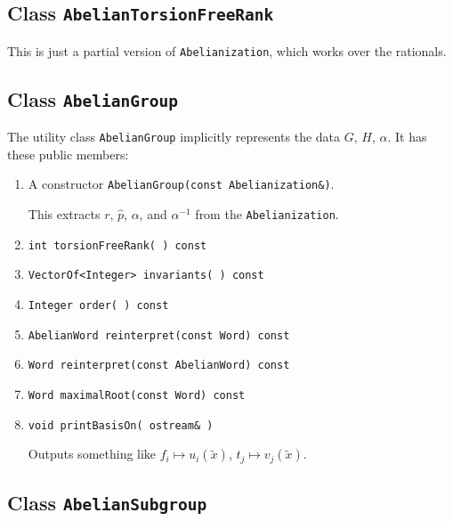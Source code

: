 \subsection{Class {\tt AbelianTorsionFreeRank}}

This is just a partial version of {\tt Abelianization}, which works
over the rationals.


\subsection{Class {\tt AbelianGroup}}

The utility class {\tt AbelianGroup} implicitly represents the data
$G$, $H$, $\alpha$.  It has these public members:

\begin{enumerate}

\item
A constructor {\tt AbelianGroup(const Abelianization\&)}.

This extracts $r$, $\hat{p}$, $\alpha$, and $\alpha^{-1}$ from the
{\tt Abelianization}.

\item
{\tt int torsionFreeRank( ) const}

\item
{\tt VectorOf<Integer> invariants( ) const}

\item
{\tt Integer order( ) const}

\item
{\tt AbelianWord reinterpret(const Word) const}

\item
{\tt Word reinterpret(const AbelianWord) const}

\item
{\tt Word maximalRoot(const Word) const}

\item
{\tt void printBasisOn( ostream\& )}

Outputs something like $f_i\mapsto u_i(\tilde{x})$, $t_j\mapsto v_j(\tilde{x})$.

\end{enumerate}


\subsection{Class {\tt AbelianSubgroup}}

